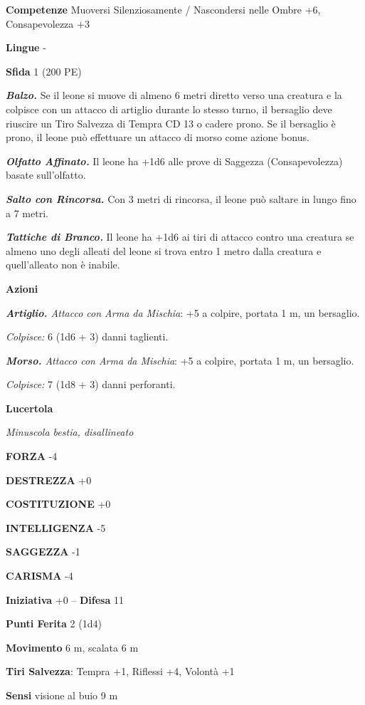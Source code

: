 \begin{multicols}{2}
\textbf{Competenze} Muoversi Silenziosamente / Nascondersi nelle Ombre +6, Consapevolezza +3

\textbf{Lingue} -

\textbf{Sfida} 1 (200 PE)

\emph{\textbf{Balzo.}} Se il leone si muove di almeno 6 metri diretto verso una creatura e la colpisce con un attacco di artiglio durante lo stesso turno, il bersaglio deve riuscire un Tiro Salvezza di Tempra CD 13 o cadere prono. Se il bersaglio è prono, il leone può effettuare un
attacco di morso come azione bonus.

\emph{\textbf{Olfatto Affinato.}} Il leone ha +1d6 alle prove di Saggezza (Consapevolezza) basate sull'olfatto.

\emph{\textbf{Salto con Rincorsa.}} Con 3 metri di rincorsa, il leone può saltare in lungo fino a 7 metri.

\emph{\textbf{Tattiche di Branco.}} Il leone ha +1d6 ai tiri di attacco contro una creatura se almeno uno degli alleati del leone si trova entro 1 metro dalla creatura e quell'alleato non è inabile.

\textbf{Azioni}

\emph{\textbf{Artiglio.} Attacco con Arma da Mischia}: +5 a colpire, portata 1 m, un bersaglio.

\emph{Colpisce:} 6 (1d6 + 3) danni taglienti. 

\emph{\textbf{Morso.} Attacco con Arma da Mischia}: +5 a colpire, portata 1 m, un bersaglio.

\emph{Colpisce:} 7 (1d8 + 3) danni perforanti.

\medskip\textbf{Lucertola}

\emph{Minuscola bestia, disallineato}

\textbf{FORZA} -4

\textbf{DESTREZZA} +0

\textbf{COSTITUZIONE} +0

\textbf{INTELLIGENZA} -5

\textbf{SAGGEZZA} -1

\textbf{CARISMA} -4

\textbf{Iniziativa} +0 -- \textbf{Difesa} 11

\textbf{Punti Ferita} 2 (1d4)

\textbf{Movimento} 6 m, scalata 6 m

\textbf{Tiri Salvezza}:  Tempra +1, Riflessi +4, Volontà +1 

\textbf{Sensi} visione al buio 9 m


\end{multicols}
